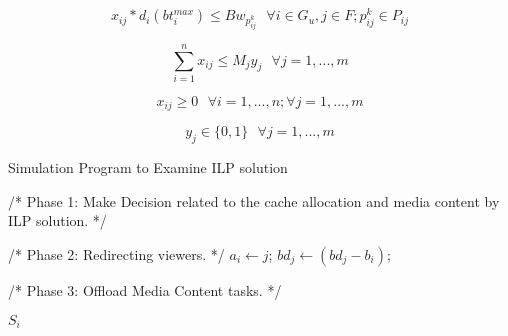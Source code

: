 \begin{equation}\label{bound_3}
x_{ij} * d_{i}( bt_{i}^{max})
\leq Bw_{p_{ij}^{k}}
\text{ } \forall i \in G_u, j \in F; p_{ij}^{k} \in P_{ij} 
\end{equation}

\begin{equation}\label{bound_2}
\sum^{n}_{i=1} x_{ij} \leq M_{j}y_{j} \text{ } \forall j = 1,...,m
\end{equation}


\begin{equation}\label{bound_3}
x_{ij} \geq 0 \text{ } \forall i = 1,...,n; \forall j = 1,...,m
\end{equation}

\begin{equation}\label{bound_3}
y_{j} \in \{0,1\} \text{ } \forall j = 1,...,m
\end{equation}

\begin{algorithm} \caption{Simulation Program to Examine ILP solution}
\begin{algorithmic}[1]


\State /* Phase 1: Make Decision related to the cache allocation and media content by ILP solution. */

\State /* Phase 2: Redirecting viewers. */
        \State $a_i \gets j$; $bd_j \gets (bd_j - b_i)$;
    \EndIf 
\EndFor

\State /* Phase 3: Offload Media Content tasks. */

\Ensure $S_i$
\end{algorithmic}
\end{algorithm}
